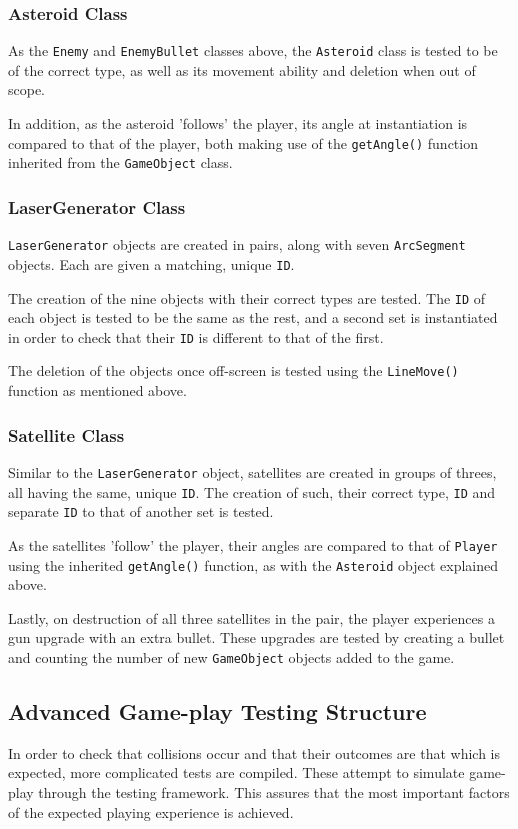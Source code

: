 \documentclass[10pt,twocolumn]{witseiepaper}
\begin{document}
\subsubsection{Asteroid Class}
As the \texttt{Enemy} and \texttt{EnemyBullet} classes above, the \texttt{Asteroid} class is tested to be of the correct type, as well as its movement ability and deletion when out of scope. 

In addition, as the asteroid 'follows' the player, its angle at instantiation is compared to that of the player, both making use of the \texttt{getAngle()} function inherited from the \texttt{GameObject} class.
\subsubsection{LaserGenerator Class}
\texttt{LaserGenerator} objects are created in pairs, along with seven \texttt{ArcSegment} objects. Each are given a matching, unique \texttt{ID}. 

The creation of the nine objects with their correct types are tested. The \texttt{ID} of each object is tested to be the same as the rest, and a second set is instantiated in order to check that their \texttt{ID} is different to that of the first.

The deletion of the objects once off-screen is tested using the \texttt{LineMove()} function as mentioned above. 
\subsubsection{Satellite Class}
Similar to the \texttt{LaserGenerator} object, satellites are created in groups of threes, all having the same, unique \texttt{ID}. The creation of such, their correct type, \texttt{ID} and separate \texttt{ID} to that of another set is tested. 

As the satellites 'follow' the player, their angles are compared to that of \texttt{Player} using the inherited \texttt{getAngle()} function, as with the \texttt{Asteroid} object explained above.

Lastly, on destruction of all three satellites in the pair, the player experiences a gun upgrade with an extra bullet. These upgrades are tested by creating a bullet and counting the number of new \texttt{GameObject} objects added to the game.

\subsection{Advanced Game-play Testing Structure}
In order to check that collisions occur and that their outcomes are that which is expected, more complicated tests are compiled. These attempt to simulate game-play through the testing framework. This assures that the most important factors of the expected playing experience is achieved.
\end{document}
